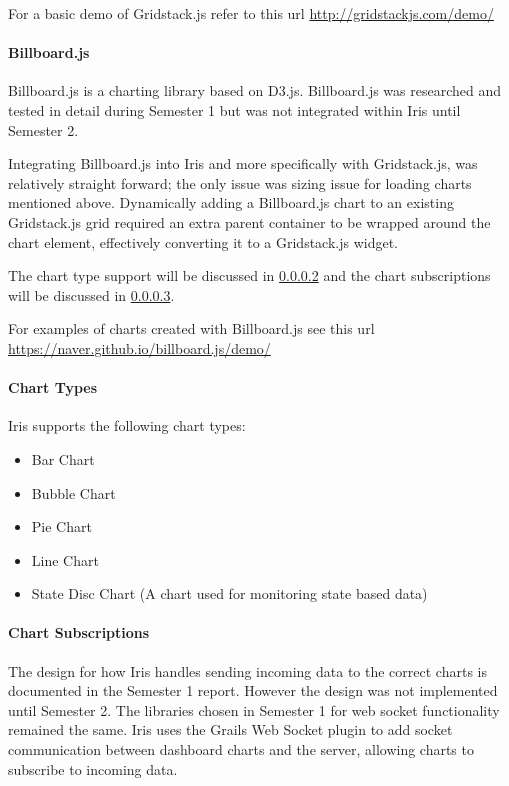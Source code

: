 \documentclass[12pt,a4paper,titlepage]{report}
\begin{document}
For a basic demo of Gridstack.js refer to this url \url{http://gridstackjs.com/demo/}

\paragraph{Billboard.js}

Billboard.js is a charting library based on D3.js. Billboard.js was researched and tested in detail during Semester 1 but was not integrated within Iris until Semester 2.

Integrating Billboard.js into Iris and more specifically with Gridstack.js, was relatively straight forward; the only issue was sizing issue for loading charts mentioned above.  
Dynamically adding a Billboard.js chart to an existing Gridstack.js grid required an extra parent container to be wrapped around the chart element, effectively converting it to a Gridstack.js widget.

The chart type support will be discussed in \cref{para:charts:fontend} and the chart subscriptions will be discussed in \cref{para:charts:subs:frontend}.

For examples of charts created with Billboard.js see this url \url{https://naver.github.io/billboard.js/demo/}

\paragraph{Chart Types}

\label{para:charts:fontend}
Iris supports the following chart types:
\begin{itemize}
    \item Bar Chart
    \item Bubble Chart
    \item Pie Chart
    \item Line Chart
    \item State Disc Chart (A chart used for monitoring state based data)
\end{itemize}

\paragraph{Chart Subscriptions}\label{para:charts:subs:frontend}

The design for how Iris handles sending incoming data to the correct charts is documented in the Semester 1 report. However the design was not implemented until Semester 2. The libraries chosen in Semester 1 for web socket functionality remained the same. Iris uses the Grails Web Socket plugin to add socket communication between dashboard charts and the server, allowing charts to subscribe to incoming data. 
\end{document}
